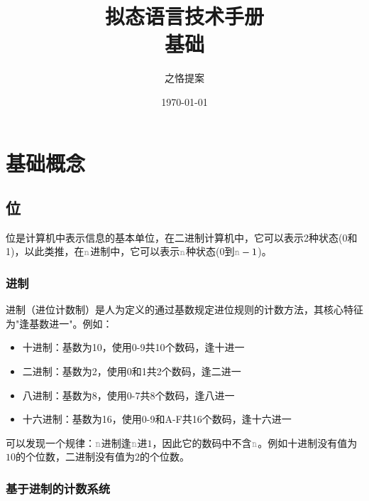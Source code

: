 \documentclass[12pt,a4paper,UTF8]{ctexart}
\title{拟态语言技术手册\\{\small 基础}}
\author{之恪提案}
\date{\today}
\newcommand{\var}[1]{\textcolor{lightgray}{\mathtt{#1}}}
\begin{document}
\maketitle
\thispagestyle{empty} %

\setcounter{page}{0} %

\maketitle
\clearpage

\tableofcontents
\newpage

\setcounter{page}{1} %

\section{基础概念}

\subsection{位}

\qquad 位是计算机中表示信息的基本单位，在二进制计算机中，它可以表示2种状态(0和1)，以此类推，在$\var{n}$进制中，它可以表示$\var{n}$种状态(0到$\var{n}-1$)。

\subsubsection{进制}

\qquad 进制（进位计数制）是人为定义的通过基数规定进位规则的计数方法，其核心特征为"逢基数进一"。例如：
\begin{itemize}
\item 十进制：基数为10，使用0-9共10个数码，逢十进一
\item 二进制：基数为2，使用0和1共2个数码，逢二进一
\item 八进制：基数为8，使用0-7共8个数码，逢八进一
\item 十六进制：基数为16，使用0-9和A-F共16个数码，逢十六进一
\end{itemize}

可以发现一个规律：$\var{n}$进制逢$\var{n}$进$1$，因此它的数码中不含$\var{n}$。例如十进制没有值为$10$的个位数，二进制没有值为$2$的个位数。

\subsubsection{基于进制的计数系统}
\end{document}
